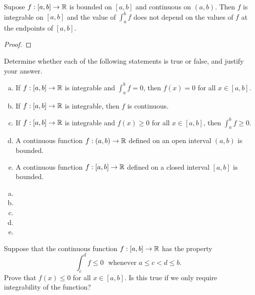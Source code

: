 \documentclass[letterpaper, twoside, 12pt]{book}
\begin{document}
\begin{theorem}[6.19]
  Supose \(f:[a,b]\to\mathbb R\) is bounded on \([a,b]\) and continuous on
  \((a,b)\). Then \(f\) is integrable on \([a,b]\) and the value of
  \(\int_a^b f\) does not depend on the values of \(f\) at the endpoints
  of \([a,b]\).
\end{theorem}
\begin{proof}

\end{proof}

\begin{exercise}[1]
  Determine whether each of the following statements is true or false, and
  justify your answer.
  \begin{enumerate}[(a)]
    \item If \(f:[a,b]\to\mathbb R\) is integrable and \(\int_a^b f=0\), then
      \(f(x)=0\) for all \(x\in[a,b]\).
    \item If \(f:[a,b]\to\mathbb R\) is integrable, then \(f\) is continuous.
    \item If \(f:[a,b]\to\mathbb R\) is integrable and \(f(x)\geq0\) for all
      \(x\in[a,b]\), then \(\int_a^b f\geq 0\).
    \item A continuous function \(f:(a,b)\to\mathbb R\) defined on an open interval
      \((a,b)\) is bounded.
    \item A continuous function \(f:[a,b]\to\mathbb R\) defined on a closed interval
      \([a,b]\) is bounded.
  \end{enumerate}
\end{exercise}
\begin{solution}
  \begin{enumerate}[(a)]
    \item
    \item
    \item
    \item
    \item
  \end{enumerate}
\end{solution}


\begin{exercise}[5]
  Suppose that the continuous function \(f:[a,b]\to\mathbb R\) has the property
  \[
    \int_c^d f\leq 0
      \text{~~whenever~}
    a\leq c<d\leq b
  .\]
  Prove that \(f(x)\leq 0\) for all \(x\in[a,b]\). Is this true if we only
  require integrability of the function?
\end{exercise}
\begin{solution}

\end{solution}
\end{document}
